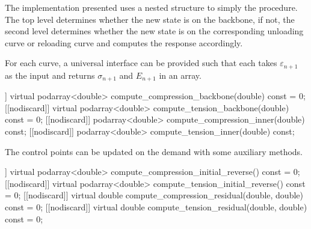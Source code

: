 The implementation presented uses a nested structure to simply the procedure. The top level determines whether the new state is on the backbone, if not, the second level determines whether the new state is on the corresponding unloading curve or reloading curve and computes the response accordingly.

For each curve, a universal interface can be provided such that each takes $\varepsilon_{n+1}$ as the input and returns $\sigma_{n+1}$ and $E_{n+1}$ in an array.
\begin{cppcode}
	[[nodiscard]] virtual podarray<double> compute_compression_backbone(double) const = 0;
	[[nodiscard]] virtual podarray<double> compute_tension_backbone(double) const = 0;
	[[nodiscard]] podarray<double> compute_compression_inner(double) const;
	[[nodiscard]] podarray<double> compute_tension_inner(double) const;
\end{cppcode}
The control points can be updated on the demand with some auxiliary methods.
\begin{cppcode}
	[[nodiscard]] virtual podarray<double> compute_compression_initial_reverse() const = 0;
	[[nodiscard]] virtual podarray<double> compute_tension_initial_reverse() const = 0;
	[[nodiscard]] virtual double compute_compression_residual(double, double) const = 0;
	[[nodiscard]] virtual double compute_tension_residual(double, double) const = 0;
\end{cppcode}

